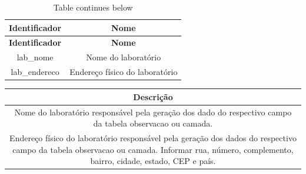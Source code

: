 \documentclass[a4paper,dvipsnames]{tufte-book}
\begin{document}
\begin{longtable}[]{@{}cc@{}}
\caption{Table continues below}\tabularnewline
\toprule
\begin{minipage}[b]{0.26\columnwidth}\centering\strut
\textbf{Identificador}\strut
\end{minipage} & \begin{minipage}[b]{0.42\columnwidth}\centering\strut
\textbf{Nome}\strut
\end{minipage}\tabularnewline
\midrule
\endfirsthead
\toprule
\begin{minipage}[b]{0.26\columnwidth}\centering\strut
\textbf{Identificador}\strut
\end{minipage} & \begin{minipage}[b]{0.42\columnwidth}\centering\strut
\textbf{Nome}\strut
\end{minipage}\tabularnewline
\midrule
\endhead
\begin{minipage}[t]{0.26\columnwidth}\centering\strut
lab\_nome\strut
\end{minipage} & \begin{minipage}[t]{0.42\columnwidth}\centering\strut
Nome do laboratório\strut
\end{minipage}\tabularnewline
\begin{minipage}[t]{0.26\columnwidth}\centering\strut
lab\_endereco\strut
\end{minipage} & \begin{minipage}[t]{0.42\columnwidth}\centering\strut
Endereço físico do laboratório\strut
\end{minipage}\tabularnewline
\bottomrule
\end{longtable}

\begin{longtable}[]{@{}c@{}}
\toprule
\begin{minipage}[b]{0.43\columnwidth}\centering\strut
\textbf{Descrição}\strut
\end{minipage}\tabularnewline
\midrule
\endhead
\begin{minipage}[t]{0.43\columnwidth}\centering\strut
Nome do laboratório responsável pela geração dos dado do respectivo
campo da tabela observacao ou camada.\strut
\end{minipage}\tabularnewline
\begin{minipage}[t]{0.43\columnwidth}\centering\strut
Endereço físico do laboratório responsável pela geração dos dados do
respectivo campo da tabela observacao ou camada. Informar rua, número,
complemento, bairro, cidade, estado, CEP e país.\strut
\end{minipage}\tabularnewline
\bottomrule
\end{longtable}
\end{document}
